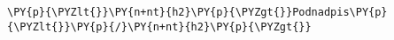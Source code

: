 \begin{Verbatim}[commandchars=\\\{\}]
\PY{p}{\PYZlt{}}\PY{n+nt}{h2}\PY{p}{\PYZgt{}}Podnadpis\PY{p}{\PYZlt{}}\PY{p}{/}\PY{n+nt}{h2}\PY{p}{\PYZgt{}}
\end{Verbatim}
